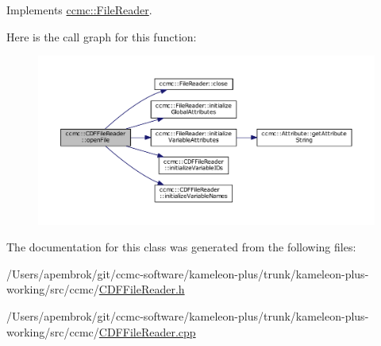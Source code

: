 Implements \hyperlink{classccmc_1_1_file_reader_ae4346cb5cf1c4861135d3f293d3da320}{ccmc\-::\-File\-Reader}.



Here is the call graph for this function\-:\nopagebreak
\begin{figure}[H]
\begin{center}
\leavevmode
\includegraphics[width=350pt]{classccmc_1_1_c_d_f_file_reader_a040e6e9a2c9f8e4aae6673fdc4a92cdb_cgraph}
\end{center}
\end{figure}




The documentation for this class was generated from the following files\-:\begin{DoxyCompactItemize}
\item 
/\-Users/apembrok/git/ccmc-\/software/kameleon-\/plus/trunk/kameleon-\/plus-\/working/src/ccmc/\hyperlink{_c_d_f_file_reader_8h}{C\-D\-F\-File\-Reader.\-h}\item 
/\-Users/apembrok/git/ccmc-\/software/kameleon-\/plus/trunk/kameleon-\/plus-\/working/src/ccmc/\hyperlink{_c_d_f_file_reader_8cpp}{C\-D\-F\-File\-Reader.\-cpp}\end{DoxyCompactItemize}
